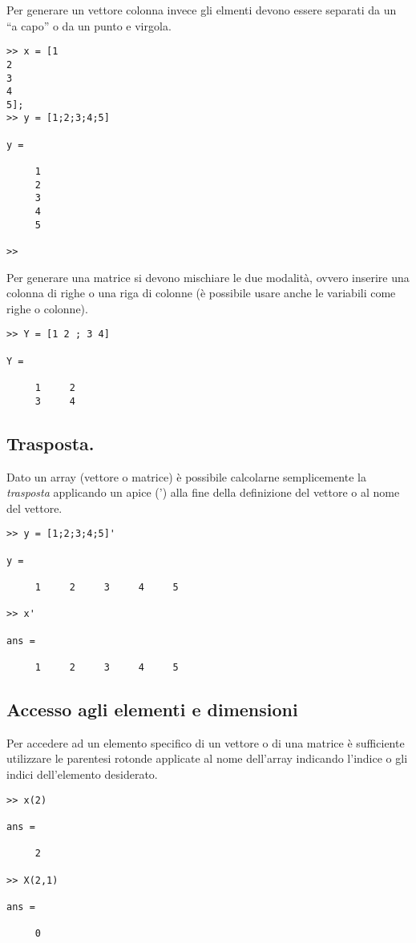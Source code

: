 Per generare un vettore colonna invece gli elmenti devono essere separati da
un ``a capo'' o da un punto e virgola.
\begin{codice}
\begin{verbatim}
>> x = [1 
2 
3 
4 
5];
>> y = [1;2;3;4;5]

y =

     1
     2
     3
     4
     5

>> 
\end{verbatim}
\end{codice}

Per generare una matrice si devono mischiare le due modalità, ovvero inserire
una colonna di righe o una riga di colonne (è possibile usare anche
le variabili come righe o colonne).
\begin{codice}
\begin{verbatim}
>> Y = [1 2 ; 3 4]

Y =

     1     2
     3     4
\end{verbatim}
\end{codice}


\subsection{Trasposta.}
Dato un array (vettore o matrice) è possibile calcolarne semplicemente la
\emph{trasposta} applicando un apice (') alla fine della definizione
del vettore o al nome del vettore.
\begin{codice}
\begin{verbatim}
>> y = [1;2;3;4;5]'

y =

     1     2     3     4     5

>> x'

ans =

     1     2     3     4     5
\end{verbatim}
\end{codice}

\subsection{Accesso agli elementi e dimensioni}
Per accedere ad un elemento specifico di un vettore o di una matrice è 
sufficiente utilizzare le parentesi rotonde applicate al nome dell'array
indicando l'indice o gli indici
dell'elemento desiderato.

\begin{codice}
\begin{verbatim}
>> x(2)

ans =

     2

>> X(2,1)

ans =

     0
\end{verbatim}
\end{codice}

